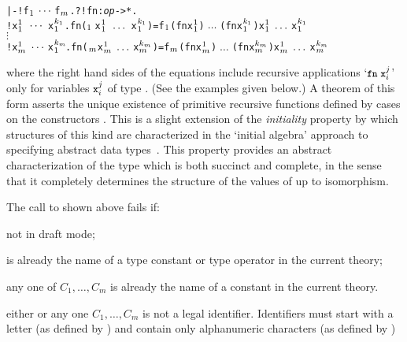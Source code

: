 {{{\def\op{{\normalsize\sl op}}
\begin{hol}\begin{alltt}
   |- !f\(\sb{1}\:\cdots\:\)f\(\sb{m}\). ?!fn:{\op}->*.
         !x\(\sb{1}\sp{1}\;\,\cdots\,\;\)x\(\sb{1}\sp{k\sb{1}}\). fn(\(\sb{1}\,\) x\(\sb{1}\sp{1}\;\,\ldots\,\;\)x\(\sb{1}\sp{k\sb{1}}\)) = f\(\sb{1}\) (fn x\(\sb{1}\sp{1}\))\(\;\ldots\;\)(fn x\(\sb{1}\sp{k\sb{1}}\)) x\(\sb{1}\sp{1}\;\ldots\;\)x\(\sb{1}\sp{k\sb{1}}\)
                                      \(\vdots\)
         !x\(\sb{m}\sp{1}\;\cdots\;\)x\(\sb{1}\sp{k\sb{m}}\!\). fn(\(\sb{m}\) x\(\sb{m}\sp{1}\;\ldots\;\)x\(\sb{m}\sp{k\sb{m}}\)) = f\(\sb{m}\) (fn x\(\sb{m}\sp{1}\))\(\;\ldots\;\)(fn x\(\sb{m}\sp{k\sb{m}}\)) x\(\sb{m}\sp{1}\;\ldots\;\)x\(\sb{m}\sp{k\sb{m}}\)
\end{alltt}\end{hol}}     


\noindent where the right hand sides of the equations include recursive
applications `$\ml{fn}\;\ml{x}_i^j$' only for variables  $\ml{x}_i^j$ of type
.  (See the examples given below.) A theorem of this form asserts the
unique existence of primitive recursive functions defined by cases on the
constructors .  This is a slight
extension of the {\it initiality\/} property by which
structures of this kind are characterized in the `initial algebra' approach to
specifying abstract data types~\cite{goguen}.  This property provides an
abstract characterization of the type  which is both succinct and
complete, in the sense that it completely determines the structure of the
values of  up to isomorphism.

The call to  shown above fails if:

\begin{myenumerate}
 
\item not in draft mode;

\item {} is already the name of a type constant or type operator in the
current theory;

\item any one of $C_1,\dots,C_{m}$ is already the name
of a constant in the current theory.

\item either  or any one $C_{1},\dots,C_{m}$ is not a
legal identifier.  Identifiers must start with a letter (as defined by
) and contain only alphanumeric characters (as defined by
)


\end{myenumerate}}}

